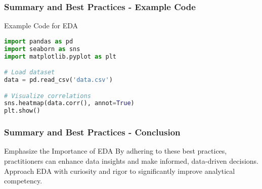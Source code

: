 \documentclass{beamer}
\begin{document}
\begin{frame}[fragile]
    \frametitle{Summary and Best Practices - Example Code}
    \begin{block}{Example Code for EDA}
        \begin{lstlisting}[language=Python]
import pandas as pd
import seaborn as sns
import matplotlib.pyplot as plt

# Load dataset
data = pd.read_csv('data.csv')

# Visualize correlations
sns.heatmap(data.corr(), annot=True)
plt.show()
        \end{lstlisting}
    \end{block}
\end{frame}

\begin{frame}[fragile]
    \frametitle{Summary and Best Practices - Conclusion}
    \begin{block}{Emphasize the Importance of EDA}
        By adhering to these best practices, practitioners can enhance data insights and make informed, data-driven decisions. Approach EDA with curiosity and rigor to significantly improve analytical competency.
    \end{block}
\end{frame}
\end{document}
